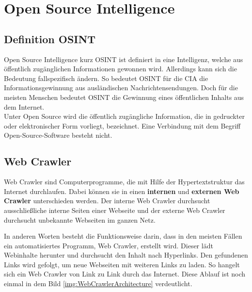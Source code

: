\section{Open Source Intelligence}
	\subsection{Definition OSINT}
	Open Source Intelligence kurz OSINT ist definiert in eine Intelligenz, welche aus öffentlich zugänglichen Informationen gewonnen wird. Allerdings kann sich die Bedeutung fallspezifisch ändern. So bedeutet OSINT für die CIA die Informationsgewinnung aus ausländischen Nachrichtensendungen. Doch für die meisten Menschen bedeutet OSINT die Gewinnung eines öffentlichen Inhalts aus dem Internet. \cite{Bazzell}\\
	Unter Open Source wird die öffentlich zugängliche Information, die in gedruckter oder elektronischer Form vorliegt, bezeichnet.\cite{steele1996open} Eine Verbindung mit dem Begriff Open-Source-Software besteht nicht.
	\subsection{Web Crawler}
		Web Crawler sind Computerprogramme, die mit Hilfe der Hypertextstruktur das Internet durchlaufen. Dabei können sie in einen \textbf{internen} und \textbf{externen Web Crawler} unterschieden werden. Der interne Web Crawler durchsucht ausschließliche interne Seiten einer Webseite und der externe Web Crawler durchsucht unbekannte Webseiten im ganzen Netz. \cite{sharma2012study}

		In anderen Worten besteht die Funktionsweise darin, dass in den meisten Fällen ein automatisiertes Programm, Web Crawler, erstellt wird. Dieser lädt Webinhalte herunter und durchsucht den Inhalt nach Hyperlinks. Den gefundenen Links wird gefolgt, um neue Webseiten mit weiteren Links zu laden. So hangelt sich ein Web Crawler von Link zu Link durch das Internet.\cite{WebScraping} Diese Ablauf ist noch einmal in dem Bild \ref{img:WebCrawlerArchitecture} verdeutlicht.
		
